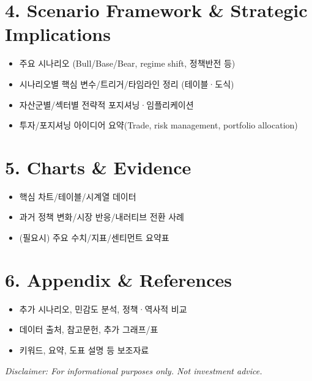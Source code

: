 \documentclass[12pt]{article}
\begin{document}
\section*{4. Scenario Framework \& Strategic Implications}
\begin{itemize}[leftmargin=1.5em]
    \item 주요 시나리오 (Bull/Base/Bear, regime shift, 정책반전 등)
    \item 시나리오별 핵심 변수/트리거/타임라인 정리 (테이블·도식)
    \item 자산군별/섹터별 전략적 포지셔닝·임플리케이션
    \item 투자/포지셔닝 아이디어 요약(Trade, risk management, portfolio allocation)
\end{itemize}

\section*{5. Charts \& Evidence}
\begin{itemize}[leftmargin=1.5em]
    \item 핵심 차트/테이블/시계열 데이터
    \item 과거 정책 변화/시장 반응/내러티브 전환 사례
    \item (필요시) 주요 수치/지표/센티먼트 요약표
\end{itemize}

\section*{6. Appendix \& References}
\begin{itemize}[leftmargin=1.5em]
    \item 추가 시나리오, 민감도 분석, 정책·역사적 비교
    \item 데이터 출처, 참고문헌, 추가 그래프/표
    \item 키워드, 요약, 도표 설명 등 보조자료
\end{itemize}

\vspace{1em}
\noindent\textit{Disclaimer: For informational purposes only. Not investment advice.}
\end{document}
